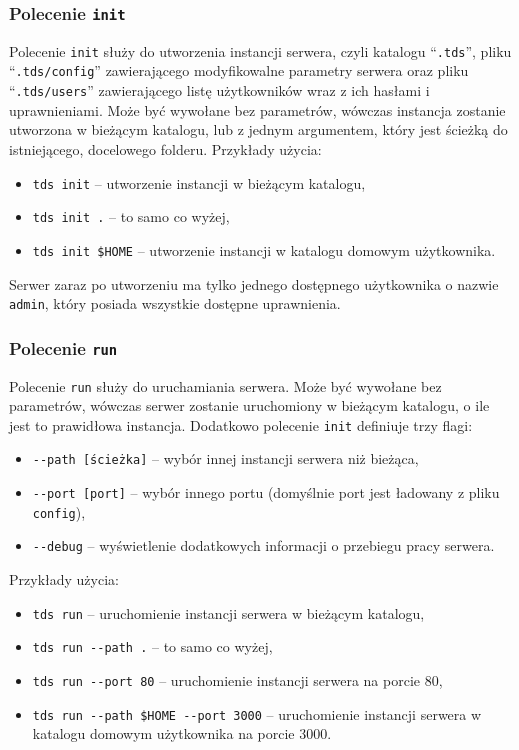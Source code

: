 \documentclass[8pt,a4paper]{article}
\newcommand{\quotes}[1]{``#1''}
\newcommand{\quotcode}[1]{\quotes{\texttt{#1}}}
\begin{document}
\subsubsection{Polecenie \texttt{init}}
Polecenie \texttt{init} służy do utworzenia instancji serwera, czyli katalogu \quotcode{.tds}, pliku \quotcode{.tds/config} zawierającego modyfikowalne parametry serwera oraz pliku \quotcode{.tds/users} zawierającego listę użytkowników wraz z ich hasłami i uprawnieniami. Może być wywołane bez parametrów, wówczas instancja zostanie utworzona w bieżącym katalogu, lub z jednym argumentem, który jest ścieżką do istniejącego, docelowego folderu. Przykłady użycia:
\begin{itemize}
    \item \texttt{tds init} -- utworzenie instancji w bieżącym katalogu,
    \item \texttt{tds init .} -- to samo co wyżej,
    \item \texttt{tds init \$HOME} -- utworzenie instancji w katalogu domowym użytkownika.
\end{itemize}
Serwer zaraz po utworzeniu ma tylko jednego dostępnego użytkownika o nazwie \texttt{admin}, który posiada wszystkie dostępne uprawnienia.

\subsubsection{Polecenie \texttt{run}}
Polecenie \texttt{run} służy do uruchamiania serwera. Może być wywołane bez parametrów, wówczas serwer zostanie uruchomiony w bieżącym katalogu, o ile jest to prawidłowa instancja. Dodatkowo polecenie \texttt{init} definiuje trzy flagi:

\begin{itemize}
    \item \texttt{-{}-path [ścieżka]} -- wybór innej instancji serwera niż bieżąca,
    \item \texttt{-{}-port [port]} -- wybór innego portu (domyślnie port jest ładowany z pliku \texttt{config}),
    \item \texttt{-{}-debug} -- wyświetlenie dodatkowych informacji o przebiegu pracy serwera.
\end{itemize}

\noindent Przykłady użycia:

\begin{itemize}
    \item \texttt{tds run} -- uruchomienie instancji serwera w bieżącym katalogu,
    \item \texttt{tds run -{}-path .} -- to samo co wyżej,
    \item \texttt{tds run -{}-port 80} -- uruchomienie instancji serwera na porcie 80,
    \item \texttt{tds run -{}-path \$HOME -{}-port 3000} -- uruchomienie instancji serwera w katalogu domowym użytkownika na porcie 3000.
\end{itemize}
\end{document}
